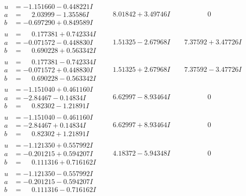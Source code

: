 \documentclass[1p]{elsarticle_modified}
\theoremstyle{definition}
\begin{document}
$$\begin{array}{c|c|c}
\begin{aligned}
u &= -1.151660 - 0.448221 I \\
a &= \phantom{-}2.03999 - 1.35586 I \\
b &= -0.697290 + 0.849589 I\end{aligned}
 & \phantom{-}8.01842 + 3.49746 I & \phantom{-0.000000 } 0 \\ \hline\begin{aligned}
u &= \phantom{-}0.177381 + 0.742334 I \\
a &= -0.071572 - 0.448830 I \\
b &= \phantom{-}0.690228 + 0.563342 I\end{aligned}
 & \phantom{-}1.51325 - 2.67968 I & \phantom{-}7.37592 + 3.47726 I \\ \hline\begin{aligned}
u &= \phantom{-}0.177381 - 0.742334 I \\
a &= -0.071572 + 0.448830 I \\
b &= \phantom{-}0.690228 - 0.563342 I\end{aligned}
 & \phantom{-}1.51325 + 2.67968 I & \phantom{-}7.37592 - 3.47726 I \\ \hline\begin{aligned}
u &= -1.151040 + 0.461160 I \\
a &= -2.84467 - 0.14834 I \\
b &= \phantom{-}0.82302 - 1.21891 I\end{aligned}
 & \phantom{-}6.62997 - 8.93464 I & \phantom{-0.000000 } 0 \\ \hline\begin{aligned}
u &= -1.151040 - 0.461160 I \\
a &= -2.84467 + 0.14834 I \\
b &= \phantom{-}0.82302 + 1.21891 I\end{aligned}
 & \phantom{-}6.62997 + 8.93464 I & \phantom{-0.000000 } 0 \\ \hline\begin{aligned}
u &= -1.121350 + 0.557992 I \\
a &= -0.201215 + 0.594207 I \\
b &= \phantom{-}0.111316 + 0.716162 I\end{aligned}
 & \phantom{-}4.18372 - 5.94348 I & \phantom{-0.000000 } 0 \\ \hline\begin{aligned}
u &= -1.121350 - 0.557992 I \\
a &= -0.201215 - 0.594207 I \\
b &= \phantom{-}0.111316 - 0.716162 I\end{aligned}

\end{array}$$
\end{document}
